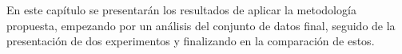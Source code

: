 En este capítulo se presentarán los resultados de aplicar la metodología propuesta, empezando por un análisis del conjunto de datos final, seguido de la presentación de dos experimentos y finalizando en la comparación de estos.
